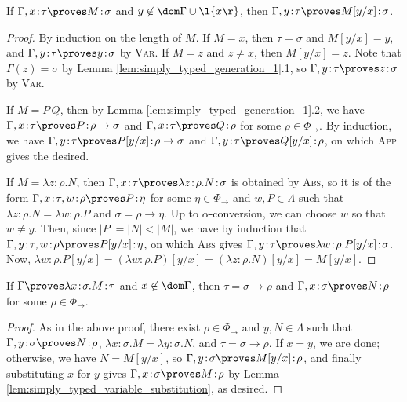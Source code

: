 \documentclass[reqno]{amsart}
\begin{document}
    \begin{lemma}\label{lem:simply_typed_variable_substitution}
        If $\Gamma,x\!:\!\tau\proves M\!:\!\sigma$ and $y\not\in\dom\Gamma\cup\l\{x\r\}$, then $\Gamma,y\!:\!\tau\proves M[y/x]\!:\!\sigma$.
    \end{lemma}
    \begin{proof}
        By induction on the length of $M$. If $M=x$, then $\tau=\sigma$ and $M[y/x]=y$, and $\Gamma,y\!:\!\tau\proves y\!:\!\sigma$ by \textsc{Var}. If $M=z$ and $z\neq x$, then $M[y/x]=z$. Note that $\Gamma(z)=\sigma$ by Lemma \ref{lem:simply_typed_generation_1}.1, so $\Gamma,y\!:\!\tau\proves z\!:\!\sigma$ by \textsc{Var}.

        If $M=P\,Q$, then by Lemma \ref{lem:simply_typed_generation_1}.2, we have $\Gamma,x\!:\!\tau\proves P\!:\!\rho\rightarrow\sigma$ and $\Gamma,x\!:\!\tau\proves Q\!:\!\rho$ for some $\rho\in\Phi_\rightarrow$. By induction, we have $\Gamma,y\!:\!\tau\proves P[y/x]\!:\!\rho\rightarrow\sigma$ and $\Gamma,y\!:\!\tau\proves Q[y/x]\!:\!\rho$, on which \textsc{App} gives the desired.

        If $M=\lambda z\!:\!\rho.N$, then $\Gamma,x\!:\!\tau\proves\lambda z\!:\!\rho.N\!:\!\sigma$ is obtained by \textsc{Abs}, so it is of the form $\Gamma,x\!:\!\tau,w\!:\!\rho\proves P\!:\!\eta$ for some $\eta\in\Phi_\rightarrow$ and $w,P\in\Lambda$ such that $\lambda z\!:\!\rho.N=\lambda w\!:\!\rho.P$ and $\sigma=\rho\to\eta$. Up to $\alpha$-conversion, we can choose $w$ so that $w\neq y$. Then, since $|P|=|N|<|M|$, we have by induction that $\Gamma,y\!:\!\tau,w\!:\!\rho\proves P[y/x]\!:\!\eta$, on which \textsc{Abs} gives $\Gamma,y\!:\!\tau\proves\lambda w\!:\!\rho.P[y/x]\!:\!\sigma$. Now, $\lambda w\!:\!\rho.P[y/x]=(\lambda w\!:\!\rho.P)[y/x]=(\lambda z\!:\!\rho.N)[y/x]=M[y/x]$.
    \end{proof}

    \begin{lemma}\label{lem:simply_typed_generation_2}
        If $\Gamma\proves\lambda x\!:\!\sigma.M\!:\!\tau$ and $x\not\in\dom\Gamma$, then $\tau=\sigma\rightarrow\rho$ and $\Gamma,x\!:\!\sigma\proves N\!:\!\rho$ for some $\rho\in\Phi_\rightarrow$.
    \end{lemma}
    \begin{proof}
        As in the above proof, there exist $\rho\in\Phi_\rightarrow$ and $y,N\in\Lambda$ such that $\Gamma,y\!:\!\sigma\proves N\!:\!\rho$, $\lambda x\!:\!\sigma.M=\lambda y\!:\!\sigma.N$, and $\tau=\sigma\rightarrow\rho$. If $x=y$, we are done; otherwise, we have $N=M[y/x]$, so $\Gamma,y\!:\!\sigma\proves M[y/x]\!:\!\rho$, and finally substituting $x$ for $y$ gives $\Gamma,x\!:\!\sigma\proves M\!:\!\rho$ by Lemma \ref{lem:simply_typed_variable_substitution}, as desired.
    \end{proof}
\end{document}
